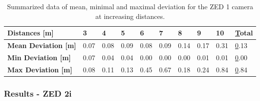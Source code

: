 
\begin{table}[h]
	\centering
	\begin{tabular}{|l|l|l|l|l|l|l|l|l|l|}
		\hline
		\textbf{Distances {[}m{]}}      & 3    & 4    & 5    & 6    & 7    & 8    & 9    & 10   & {\ul Total} \\ \hline
		\textbf{Mean Deviation {[}m{]}} & 0.07 & 0.08 & 0.09 & 0.08 & 0.09 & 0.14 & 0.17 & 0.31 & {\ul 0.13}  \\ \hline
		\textbf{Min Deviation {[}m{]}}  & 0.07 & 0.04 & 0.04 & 0.00 & 0.00 & 0.00 & 0.01 & 0.01 & {\ul 0.00}  \\ \hline
		\textbf{Max Deviation {[}m{]}}  & 0.08 & 0.11 & 0.13 & 0.45 & 0.67 & 0.18 & 0.24 & 0.84 & {\ul 0.84}  \\ \hline
	\end{tabular}
	\caption{Summarized data of mean, minimal and maximal deviation for the ZED 1 camera at increasing distances.}
	\label{tab:resultsZed1}
\end{table}




\subsubsection{Results - ZED 2i}

